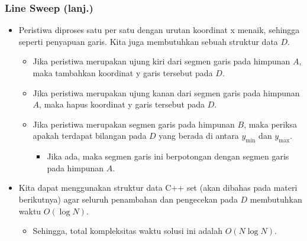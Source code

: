 \begin{frame}[fragile]
\frametitle{Line Sweep (lanj.)}
\begin{itemize}
  \item Peristiwa diproses satu per satu dengan urutan koordinat x menaik, sehingga seperti penyapuan garis. Kita juga membutuhkan sebuah struktur data $D$.
  \begin{itemize}
    \item Jika peristiwa merupakan ujung kiri dari segmen garis pada himpunan $A$, maka tambahkan koordinat y garis tersebut pada $D$.
    \item Jika peristiwa merupakan ujung kanan dari segmen garis pada himpunan $A$, maka hapus koordinat y garis tersebut pada $D$.
    \item Jika peristiwa merupakan segmen garis pada himpunan $B$, maka periksa apakah terdapat bilangan pada $D$ yang berada di antara $y_{\min}$ dan $y_{\max}$.
    \begin{itemize}
      \item Jika ada, maka segmen garis ini berpotongan dengan segmen garis pada himpunan $A$.
    \end{itemize}
  \end{itemize}
  \item Kita dapat menggunakan struktur data C++ set (akan dibahas pada materi berikutnya) agar seluruh penambahan dan pengecekan pada $D$ membutuhkan waktu $O(\log N)$.
  \begin{itemize}
    \item Sehingga, total kompleksitas waktu solusi ini adalah $O(N \log N)$.
  \end{itemize}
\end{itemize}
\end{frame}


